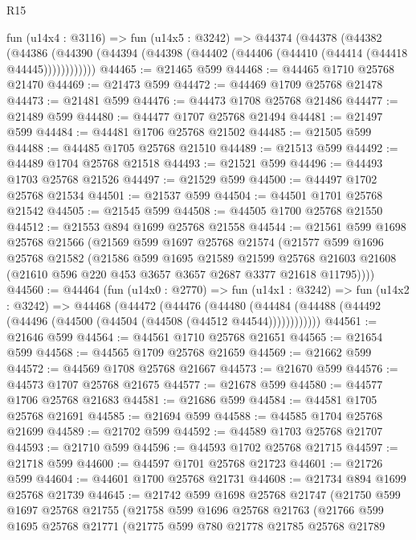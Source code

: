 \begin{lexlean}{R15}
\begin{coremodule}
    fun (u14x4 : @3116) =>
    fun (u14x5 : @3242) =>
    @44374
      (@44378
        (@44382
          (@44386 (@44390 (@44394 (@44398 (@44402 (@44406 (@44410 (@44414 (@44418 @44445))))))))))))
@44465 := @21465 @599
@44468 := @44465 @1710 @25768 @21470
@44469 := @21473 @599
@44472 := @44469 @1709 @25768 @21478
@44473 := @21481 @599
@44476 := @44473 @1708 @25768 @21486
@44477 := @21489 @599
@44480 := @44477 @1707 @25768 @21494
@44481 := @21497 @599
@44484 := @44481 @1706 @25768 @21502
@44485 := @21505 @599
@44488 := @44485 @1705 @25768 @21510
@44489 := @21513 @599
@44492 := @44489 @1704 @25768 @21518
@44493 := @21521 @599
@44496 := @44493 @1703 @25768 @21526
@44497 := @21529 @599
@44500 := @44497 @1702 @25768 @21534
@44501 := @21537 @599
@44504 := @44501 @1701 @25768 @21542
@44505 := @21545 @599
@44508 := @44505 @1700 @25768 @21550
@44512 := @21553 @894 @1699 @25768 @21558
@44544 := @21561
    @599
    @1698
    @25768
    @21566
    (@21569
      @599
      @1697
      @25768
      @21574
      (@21577
        @599
        @1696
        @25768
        @21582
        (@21586
          @599
          @1695
          @21589
          @21599
          @25768
          @21603
          @21608
          (@21610 @596 @220 @453 @3657 @3657 @2687 @3377 @21618 @11795))))
@44560 := @44464
    (fun (u14x0 : @2770) =>
    fun (u14x1 : @3242) =>
    fun (u14x2 : @3242) =>
    @44468
      (@44472
        (@44476
          (@44480 (@44484 (@44488 (@44492 (@44496 (@44500 (@44504 (@44508 (@44512 @44544))))))))))))
@44561 := @21646 @599
@44564 := @44561 @1710 @25768 @21651
@44565 := @21654 @599
@44568 := @44565 @1709 @25768 @21659
@44569 := @21662 @599
@44572 := @44569 @1708 @25768 @21667
@44573 := @21670 @599
@44576 := @44573 @1707 @25768 @21675
@44577 := @21678 @599
@44580 := @44577 @1706 @25768 @21683
@44581 := @21686 @599
@44584 := @44581 @1705 @25768 @21691
@44585 := @21694 @599
@44588 := @44585 @1704 @25768 @21699
@44589 := @21702 @599
@44592 := @44589 @1703 @25768 @21707
@44593 := @21710 @599
@44596 := @44593 @1702 @25768 @21715
@44597 := @21718 @599
@44600 := @44597 @1701 @25768 @21723
@44601 := @21726 @599
@44604 := @44601 @1700 @25768 @21731
@44608 := @21734 @894 @1699 @25768 @21739
@44645 := @21742
    @599
    @1698
    @25768
    @21747
    (@21750
      @599
      @1697
      @25768
      @21755
      (@21758
        @599
        @1696
        @25768
        @21763
        (@21766
          @599
          @1695
          @25768
          @21771
          (@21775
            @599
            @780
            @21778
            @21785
            @25768
            @21789

\end{coremodule}
\end{lexlean}
